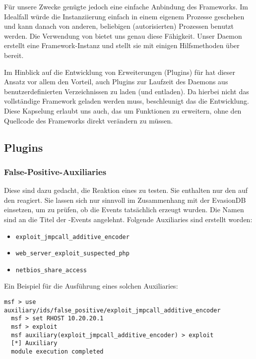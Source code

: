 Für unsere Zwecke genügte jedoch eine einfache Anbindung des Frameworks. Im
Idealfall würde die Instanziierung einfach in einem eigenem Prozesse geschehen
und kann danach von anderen, beliebigen (autorisierten) Prozessen benutzt
werden. Die Verwendung von  bietet uns genau diese Fähigkeit. Unser
Daemon erstellt eine Framework-Instanz und stellt sie mit einigen Hilfsmethoden
über  bereit.

Im Hinblick auf die Entwicklung von Erweiterungen (Plugins) für  hat
dieser Ansatz vor allem den Vorteil, auch Plugins zur Laufzeit des Daemons aus
benutzerdefinierten Verzeichnissen zu laden (und entladen). Da hierbei nicht
das vollständige Framework geladen werden muss, beschleunigt das die Entwicklung.
Diese Kapselung erlaubt uns auch, das  um Funktionen zu erweitern,
ohne den Quellcode des Frameworks direkt verändern zu müssen.

\newpage
\subsection{Plugins}
\label{sub_sec:msf_plugins}

\subsubsection{False-Positive-Auxiliaries}
\label{msf-false-positives}
\authors{\BK}{\HM \and \LM \and \DE \and \MW}

Diese  sind dazu gedacht,
die Reaktion eines  zu testen. Sie enthalten nur den 
auf den  reagiert. Sie
lassen sich nur sinnvoll im Zusammenhang mit der EvasionDB einsetzen,
um zu prüfen, ob die Events tatsächlich erzeugt wurden. Die Namen sind
an die Titel der -Events angelehnt. Folgende Auxiliaries sind
erstellt worden:

\begin{itemize}
  \item \texttt{exploit\_jmpcall\_additive\_encoder}
  \item \texttt{web\_server\_exploit\_suspected\_php}
  \item \texttt{netbios\_share\_access}
\end{itemize}

Ein Beispiel für die Ausführung eines solchen Auxiliaries:

\begin{lstlisting}[language={}]
  msf > use auxiliary/ids/false_positive/exploit_jmpcall_additive_encoder
  msf > set RHOST 10.20.20.1
  msf > exploit
  msf auxiliary(exploit_jmpcall_additive_encoder) > exploit
  [*] Auxiliary
  module execution completed
\end{lstlisting}


